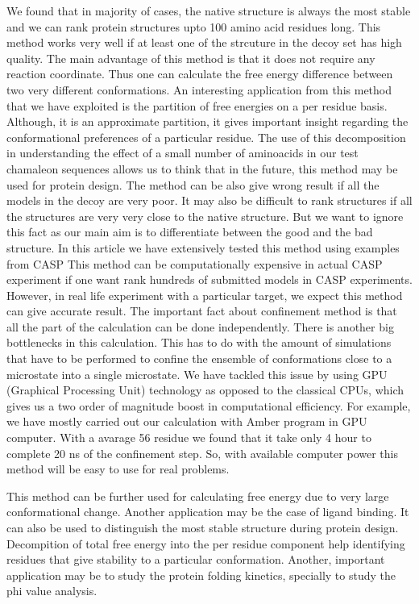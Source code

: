 \documentclass[12pt]{article}
\begin{document}
We found that in majority of cases, the native structure is always the most stable and we can rank
protein structures upto 100 amino acid residues long. This method works very well if at least one of
the strcuture in the decoy set has high quality. The main advantage of this method is that it does
not require any reaction coordinate. Thus one can calculate the free energy difference between two
very different conformations. An interesting application from this method that we have exploited is
the partition of free energies on a per residue basis. Although, it is an approximate partition, it
gives important insight regarding the conformational preferences of a particular residue. The use of
this decomposition in understanding the effect of a small number of aminoacids in our test chamaleon
sequences allows us to think that in the future, this method may be used for protein design. The
method can be also give wrong result if all the models in the decoy are very poor. It may also be
difficult to rank structures if all the structures are very very close to the native structure. But
we want to ignore this fact as our main aim is to differentiate between the good and the bad
structure. In this article we have extensively tested this method using examples from CASP This
method can be computationally expensive in actual CASP experiment if one want rank hundreds of
submitted models in CASP experiments. However, in real life experiment with a particular target, we
expect this method can give accurate result. The important fact about confinement method is that all
the part of the calculation can be done independently. There is another big bottlenecks in this
calculation. This has to do with the amount of simulations that have to be performed to confine the
ensemble of conformations close to a microstate into a single microstate. We have tackled this issue
by using GPU (Graphical Processing Unit) technology as opposed to the classical CPUs, which gives us
a two order of magnitude boost in computational efficiency. For example, we have mostly carried out
our calculation with Amber program \cite{Case2005} in GPU computer. With a avarage 56 residue we
found that it take only 4 hour to complete 20 ns of the confinement step. So, with available
computer power this method will be easy to use for real problems. 
 
This method can be further used for calculating free energy due to very large conformational change.
Another application may be the case of ligand binding. It can also be used to distinguish the most
stable structure during protein design. Decompition of total free energy into the per residue
component help identifying residues that give stability to a particular conformation. Another,
important application may be to study the protein folding kinetics, specially to study the phi value
analysis.            
\end{document}
